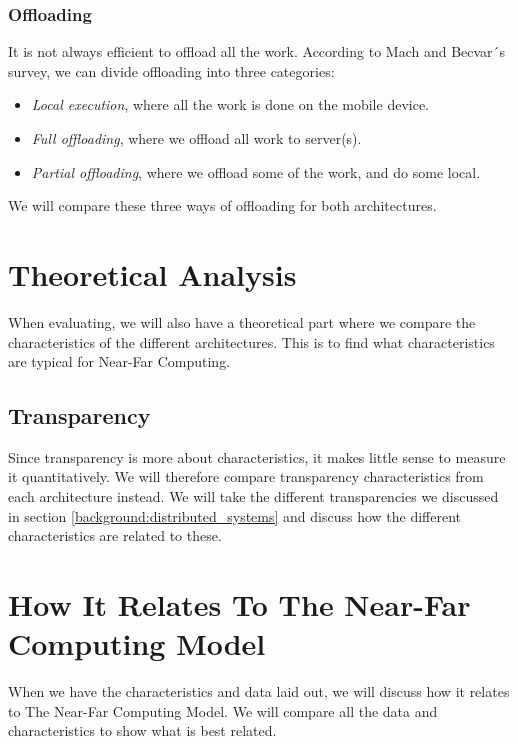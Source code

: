 \subsubsection{Offloading}
It is not always efficient to offload all the work. According to Mach and Becvar´s survey\cite{mach_mobile_2017}, we can divide offloading into three categories:
\begin{itemize}
    \item \textit{Local execution}, where all the work is done on the mobile device.
    \item \textit{Full offloading}, where we offload all work to server(s).
    \item \textit{Partial offloading}, where we offload some of the work, and do some local.
\end{itemize}
We will compare these three ways of offloading for both architectures.















\section{Theoretical Analysis}
When evaluating, we will also have a theoretical part where we compare the characteristics of the different architectures. This is to find what characteristics are typical for Near-Far Computing.

\subsection{Transparency}
Since transparency is more about characteristics, it makes little sense to measure it quantitatively. We will therefore compare transparency characteristics from each architecture instead. We will take the different transparencies we discussed in section \ref{background:distributed_systems} and discuss how the different characteristics are related to these.




\section{How It Relates To The Near-Far Computing Model}
When we have the characteristics and data laid out, we will discuss how it relates to The Near-Far Computing Model. We will compare all the data and characteristics to show what is best related.









